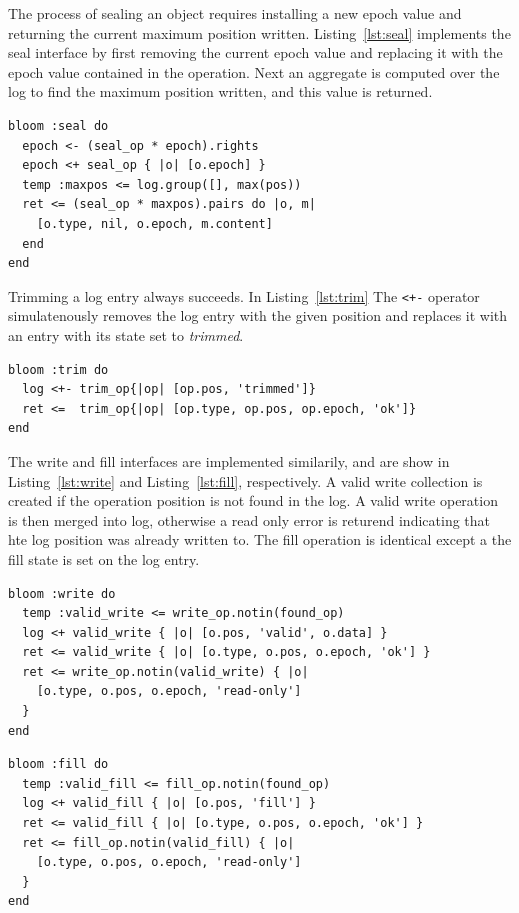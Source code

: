 \documentclass[10pt,twocolumn]{article}
\begin{document}
The process of sealing an object requires installing a new epoch value and
returning the current maximum position written. Listing~\ref{lst:seal} 
implements the seal interface by first removing the current epoch value and
replacing it with the epoch value contained in the operation. Next an aggregate
is computed over the log to find the maximum position written, and this value
is returned.

\begin{lstlisting}[caption={Seal}, label=lst:seal]
bloom :seal do
  epoch <- (seal_op * epoch).rights
  epoch <+ seal_op { |o| [o.epoch] }
  temp :maxpos <= log.group([], max(pos))
  ret <= (seal_op * maxpos).pairs do |o, m|
    [o.type, nil, o.epoch, m.content]
  end
end
\end{lstlisting}

Trimming a log entry always succeeds. In Listing~\ref{lst:trim} The
\texttt{<+-} operator simulatenously removes the log entry with the given 
position and replaces it with an entry with its state set to \emph{trimmed}.

\begin{lstlisting}[caption={Trim}, label=lst:trim]
bloom :trim do
  log <+- trim_op{|op| [op.pos, 'trimmed']}
  ret <=  trim_op{|op| [op.type, op.pos, op.epoch, 'ok']}
end
\end{lstlisting}

The write and fill interfaces are implemented similarily, and are show in
Listing~\ref{lst:write} and Listing~\ref{lst:fill}, respectively.  A valid
write collection is created if the operation position is not found in the log.
A valid write operation is then merged into log, otherwise a read only error is
returend indicating that hte log position was already written to.
The fill operation is identical except a the fill state is set on the log entry.

\begin{lstlisting}[caption={Write}, label=lst:write]
bloom :write do
  temp :valid_write <= write_op.notin(found_op)
  log <+ valid_write { |o| [o.pos, 'valid', o.data] }
  ret <= valid_write { |o| [o.type, o.pos, o.epoch, 'ok'] }
  ret <= write_op.notin(valid_write) { |o|
    [o.type, o.pos, o.epoch, 'read-only']
  }
end
\end{lstlisting}

\begin{lstlisting}[caption={Fill}, label=lst:fill]
bloom :fill do
  temp :valid_fill <= fill_op.notin(found_op)
  log <+ valid_fill { |o| [o.pos, 'fill'] }
  ret <= valid_fill { |o| [o.type, o.pos, o.epoch, 'ok'] }
  ret <= fill_op.notin(valid_fill) { |o|
    [o.type, o.pos, o.epoch, 'read-only']
  }
end
\end{lstlisting}
\end{document}
